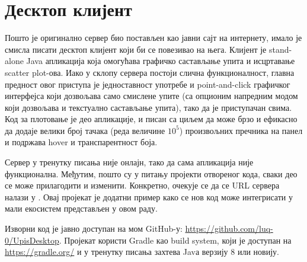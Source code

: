 \chapter{Десктоп клијент}\label{ch:A}

Пошто је оригинално сервер био постављен као јавни сајт на интернету, имало је смисла писати десктоп клијент који би се повезивао на њега. Клијент је stand-alone Java апликација која омогућава графичко састављање упита и исцртавање scatter plot-ова. Иако у склопу сервера постоји слична функционалност, главна предност овог приступа је једноставност употребе и point-and-click графичког интерфејса који дозвољава само смислене упите (са опционим напредним модом који дозвољава и текстуално састављање упита), тако да је приступачан свима. Код за плотовање је део апликације, и писан са циљем да може брзо и ефикасно да додаје велики број тачака (реда величине $10^5$) произвољних пречника на панел и подржава hover и транспарентност боја.

Сервер у тренутку писања није онлајн, тако да сама апликација није функционална. Међутим, пошто су у питању пројекти отвореног кода, сваки део се може прилагодити и изменити. Конкретно, очекује се да се URL сервера налази у . Овај пројекат је додатни пример како се нов код може интегрисати у мали екосистем представљен у овом раду.

Изворни код је јавно доступан на мом GitHub-у: \url{https://github.com/luq-0/UpisDesktop}. Пројекат користи Gradle као build system, који је доступан на \url{https://gradle.org/} и у тренутку писања захтева Javа верзију 8 или новију.